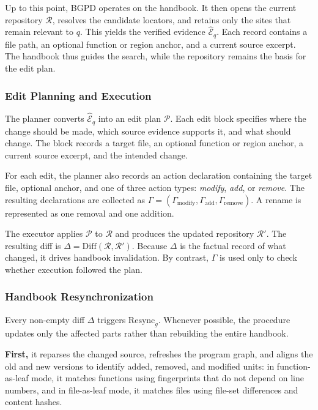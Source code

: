 \documentclass[]{ailab}
\newcommand{\hbsmall}{\textsf{function-as-leaf}}
\newcommand{\hblarge}{\textsf{file-as-leaf}}
\begin{document}
Up to this point, BGPD operates on the handbook. It then opens the current
repository $\mathcal{R}$, resolves the candidate locators, and retains only the
sites that remain relevant to $q$. This yields the verified evidence
$\widehat{\mathcal{E}}_q$. Each record contains a file path, an optional function
or region anchor, and a current source excerpt. The handbook thus guides the
search, while the repository remains the basis for the edit plan.

\subsubsection{Edit Planning and Execution}

The planner converts $\widehat{\mathcal{E}}_q$ into an edit plan $\mathcal{P}$.
Each edit block specifies where the change should be made, which source evidence
supports it, and what should change. The block records a target file, an optional
function or region anchor, a current source excerpt, and the intended change.

For each edit, the planner also records an action declaration containing the
target file, optional anchor, and one of three action types: \emph{modify},
\emph{add}, or \emph{remove}. The resulting declarations are collected as
$\Gamma=(\Gamma_{\mathrm{modify}},\Gamma_{\mathrm{add}},
\Gamma_{\mathrm{remove}})$. A rename is represented as one removal and one
addition.

The executor applies $\mathcal{P}$ to $\mathcal{R}$ and produces the updated
repository $\mathcal{R}'$. The resulting diff is
$\Delta=\mathrm{Diff}(\mathcal{R},\mathcal{R}')$. Because $\Delta$ is the
factual record of what changed, it drives handbook invalidation. By contrast,
$\Gamma$ is used only to check whether execution followed the plan.

\subsubsection{Handbook Resynchronization}

Every non-empty diff $\Delta$ triggers $\mathrm{Resync}_g$. Whenever possible,
the procedure updates only the affected parts rather than rebuilding the entire
handbook.

\textbf{First,} it reparses the changed source, refreshes the program graph, and
aligns the old and new versions to identify added, removed, and modified units:
in \hbsmall{} mode, it matches functions using fingerprints that do not depend on
line numbers, and in \hblarge{} mode, it matches files using file-set
differences and content hashes.
\end{document}
